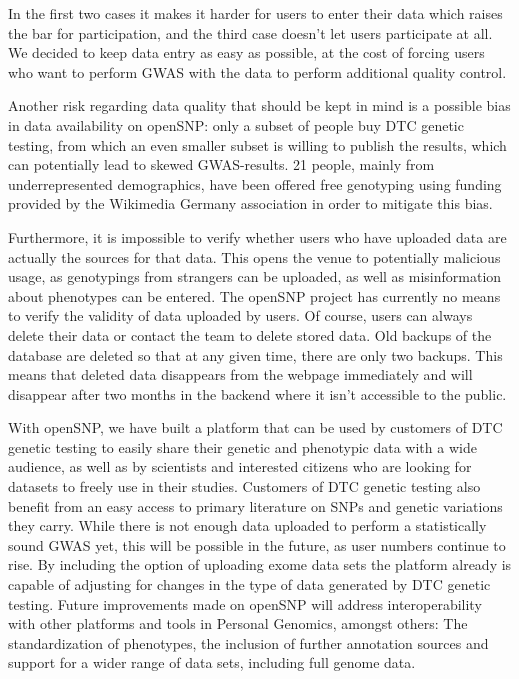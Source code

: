 \documentclass[10pt]{article}
\begin{document}
In the first two cases it makes it harder 
for users to enter their data which raises the bar for participation, and the third case doesn't let users participate at all.
We decided to keep data entry as easy as possible, at the cost of forcing users who want to perform GWAS with the data to perform additional quality control.

Another risk regarding data quality that should be kept in mind is a possible bias in data availability on openSNP: only a subset of people buy DTC genetic testing, from which an even smaller subset is willing to publish the results, which can potentially lead to skewed GWAS-results. 21 people, mainly from underrepresented demographics, have been offered free genotyping using funding provided by the Wikimedia Germany association in order to mitigate this bias. 

Furthermore, it is impossible to verify whether users who have uploaded data are actually the sources for that data. This opens the venue to potentially malicious usage, as genotypings from strangers can be uploaded, as well as misinformation about phenotypes can be entered. The openSNP project has currently no means to verify the validity of data uploaded by users. Of course, users can always delete their data or contact the team to delete stored data. Old backups of the database are deleted so that at any given time, there are only two backups. This means that deleted data disappears from the webpage immediately and will disappear after two months in the backend where it isn't accessible to the public.

With openSNP, we have built a platform that can be used by customers of DTC genetic testing to easily share their genetic and phenotypic 
data with a wide audience, as well as by scientists and interested citizens who are looking for datasets to freely use in their studies.
Customers of DTC genetic testing also benefit from an easy access to primary literature on SNPs and genetic variations they carry. 
While there is not enough data uploaded to perform a statistically sound GWAS yet, this will be possible in the future, as user numbers continue to rise. By including the option of uploading exome data sets the platform already is capable of adjusting for changes in the type of data generated by DTC genetic testing. Future improvements made on openSNP will address interoperability with other platforms and tools in Personal Genomics, amongst others: The standardization of phenotypes, the inclusion of further annotation sources and support for a wider range of data sets, including full genome data.
\end{document}

